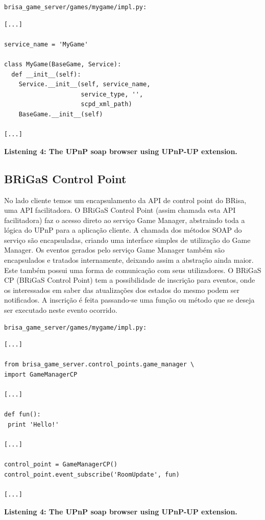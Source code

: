 \documentclass[a4paper]{sbgames}               %
\begin{document}
\begin{verbatim}
brisa_game_server/games/mygame/impl.py:
\end{verbatim}

\begin{lstlisting}[name=soap_browser_new]
[...]

service_name = 'MyGame'

class MyGame(BaseGame, Service):
  def __init__(self):
    Service.__init__(self, service_name,
                     service_type, '',
                     scpd_xml_path)
    BaseGame.__init__(self)

[...]
\end{lstlisting}
\vspace{-2mm}
\scriptsize
\textbf{Listening 4: The UPnP soap browser using UPnP-UP extension.}
\vspace{3mm}
\normalsize

\subsection{BRiGaS Control Point}

No lado cliente temos um encapsulamento da API de control point do BRisa, uma API facilitadora. O BRiGaS Control Point (assim chamada esta API facilitadora) faz o acesso direto ao serviço Game Manager, abstraindo toda a lógica do UPnP para a aplicação cliente. A chamada dos métodos SOAP do serviço são encapsuladas, criando uma interface simples de utilização do Game Manager.
Os eventos gerados pelo serviço Game Manager também são encapsulados e tratados internamente, deixando assim a abstração ainda maior.
Este também possui uma forma de comunicação com seus utilizadores. O BRiGaS CP (BRiGaS Control Point) tem a possibilidade de inscrição para eventos, onde os interessados em saber das atualizações dos estados do mesmo podem ser notificados. A inscrição é feita passando-se uma função ou método que se deseja ser executado neste evento ocorrido.


\begin{verbatim}
brisa_game_server/games/mygame/impl.py:
\end{verbatim}

\begin{lstlisting}[name=soap_browser_new]
[...]

from brisa_game_server.control_points.game_manager \
import GameManagerCP

[...]

def fun():
 print 'Hello!'

[...]

control_point = GameManagerCP()
control_point.event_subscribe('RoomUpdate', fun)

[...]
\end{lstlisting}
\vspace{-2mm}
\scriptsize
\textbf{Listening 4: The UPnP soap browser using UPnP-UP extension.}
\vspace{3mm}
\normalsize
\end{document}
